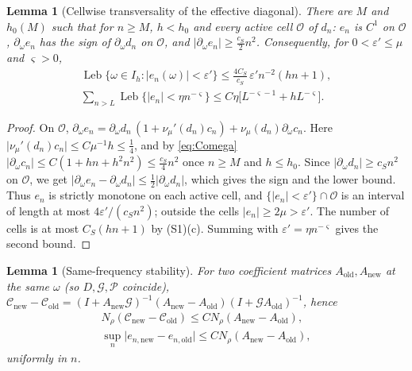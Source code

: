 \documentclass[11pt]{amsart}
\numberwithin{equation}{section}
\newtheorem{lemma}[theorem]{Lemma}
\theoremstyle{definition}
\theoremstyle{remark}
\newcommand{\abs}[1]{\lvert #1\rvert}
\newcommand{\Leb}{\operatorname{Leb}}
\newcommand{\cG}{\mathcal G}
\newcommand{\cP}{\mathcal P}
\newcommand{\cC}{\mathcal C}
\begin{document}
\begin{lemma}[Cellwise transversality of the effective diagonal]\label{lem:effmono}
There are $M$ and $h_0(M)$ such that for $n\ge M$, $h<h_0$ and every active cell $\mathcal O$ of $d_n$: $e_n$ is $C^1$ on $\mathcal O$, $\partial_\omega e_n$ has the sign of $\partial_\omega d_n$ on $\mathcal O$, and $\abs{\partial_\omega e_n}\ge\frac{c_S}2n^2$. Consequently, for $0<\varepsilon'\le\mu$ and $\varsigma>0$,
\begin{equation}\label{eq:smallgap}
\begin{gathered}
\Leb\{\omega\in I_h:\abs{e_n(\omega)}<\varepsilon'\}\le\frac{4C_S}{c_S}\,\varepsilon'n^{-2}(hn+1),\\
\sum_{n>L}\Leb\{\abs{e_n}<\eta n^{-\varsigma}\}\le C\eta\bigl[L^{-\varsigma-1}+hL^{-\varsigma}\bigr].
\end{gathered}
\end{equation}
\end{lemma}

\begin{proof}
On $\mathcal O$, $\partial_\omega e_n=\partial_\omega d_n\,(1+\nu_\mu'(d_n)c_n)+\nu_\mu(d_n)\partial_\omega c_n$. Here $\abs{\nu_\mu'(d_n)c_n}\le C\mu^{-1}h\le\frac14$, and by \eqref{eq:Comega} $\abs{\partial_\omega c_n}\le C(1+hn+h^2n^2)\le\frac{c_S}4n^2$ once $n\ge M$ and $h\le h_0$. Since $\abs{\partial_\omega d_n}\ge c_Sn^2$ on $\mathcal O$, we get $\abs{\partial_\omega e_n-\partial_\omega d_n}\le\frac12\abs{\partial_\omega d_n}$, which gives the sign and the lower bound. Thus $e_n$ is strictly monotone on each active cell, and $\{\abs{e_n}<\varepsilon'\}\cap\mathcal O$ is an interval of length at most $4\varepsilon'/(c_Sn^2)$; outside the cells $\abs{e_n}\ge2\mu>\varepsilon'$. The number of cells is at most $C_S(hn+1)$ by (S1)(c). Summing with $\varepsilon'=\eta n^{-\varsigma}$ gives the second bound.
\end{proof}

\begin{lemma}[Same-frequency stability]\label{lem:samefreq}
For two coefficient matrices $A_{\mathrm{old}},A_{\mathrm{new}}$ at the same $\omega$ (so $D,\cG,\cP$ coincide), $\cC_{\mathrm{new}}-\cC_{\mathrm{old}}=(I+A_{\mathrm{new}}\cG)^{-1}(A_{\mathrm{new}}-A_{\mathrm{old}})(I+\cG A_{\mathrm{old}})^{-1}$, hence
\begin{equation}\label{eq:stab}
\begin{gathered}
N_\rho(\cC_{\mathrm{new}}-\cC_{\mathrm{old}})\le CN_\rho(A_{\mathrm{new}}-A_{\mathrm{old}}),\\
\sup_n\abs{e_{n,\mathrm{new}}-e_{n,\mathrm{old}}}\le CN_\rho(A_{\mathrm{new}}-A_{\mathrm{old}}),
\end{gathered}
\end{equation}
uniformly in $n$.
\end{lemma}
\end{document}
